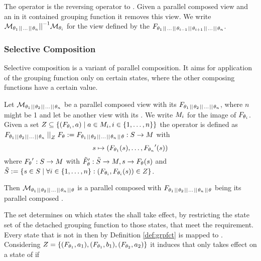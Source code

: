 \documentclass[preview]{standalone}
\begin{document}
The operator \pllrev is the reversing operator to \pll. Given a parallel composed view and an in it contained grouping function it removes this view. We write $\view[\viewppty_1 \pll \dots \pll \viewppty_n] \pllrev \view[\viewppty_i]$ for the view defined by the \grpfctN $\grpfct[\viewppty_1 \pll \dots \pll \viewppty_{i-1} \pll \viewppty_{i+1} \pll \dots \pll \viewppty_n]$.

\subsubsection{Selective Composition} \label{subsec:selecitvecomp}
Selective composition is a variant of parallel composition. It aims for application of the grouping function only on certain states, where the other composing functions have a certain value.

\begin{definition}
	Let $\view[\viewppty_1 \pll \viewppty_2 \pll \dots \pll 
	\viewppty_n]$ be a parallel composed view with its \grpfctN $\grpfct[{\viewppty_1 \pll \viewppty_2 \pll \dots \pll \viewppty_n}]$, where $n$ might be 1 and let \view be another view with its \grpfctN \grpfct. 
	We write $\imggrp_i$ for the image of $\grpfct[\viewppty_i]$. 
	Given a set $\compselectset \subseteq \{ (\grpfct[\viewppty_i], a) \mid a \in \imggrp_i, i \in \{1, \dots, n\}\}$ the operator \compselectpure is defined as $\grpfct[{\viewppty_1 \pll \viewppty_2 \pll \dots \pll \viewppty_n}] \compselect \grpfct := \grpfct[{\viewppty_1 \pll \viewppty_2 \pll \dots \pll \viewppty_n} \pll \viewppty]: \states \to \arbset$ with
	\[
	\state \mapsto (\grpfct[\viewppty_1](\state), \dots, \grpfct[\viewppty_n]'(\state))
	\]
	where $\grpfct' : \states \to \imggrp$ with $\grpfctsub' : \smstates \to \imggrp, \state \to \grpfct(\state)$ and $\smstates := \{\state \in \states \mid \forall i \in \{1, \dots, n\} : (\grpfct[\viewppty_i], \grpfct[\viewppty_i](\state)) \in \compselectset\}$.
	
	
	
	\noindent
	Then $\view[\viewppty_1 \pll \viewppty_2 \pll \dots \pll 
	\viewppty_n \pll \viewppty]$ is a parallel composed \viewN with $\grpfct[{\viewppty_1 \pll \viewppty_2 \pll \dots \pll \viewppty_n} \pll \viewppty]$ being its parallel composed \grpfctN.
	\label{def:compositionselective}
\end{definition}

The set \compselectset determines on which states the \viewN \view shall take effect, by restricting the state set \smstates of the detached grouping function to those states, that meet the requirement. Every state that is not in \smstates then by Definition \ref{def:grpfct} is mapped to \remelem. Considering $\compselectset = \{(\grpfct[\viewppty_1], a_1),(\grpfct[\viewppty_1], b_1), (\grpfct[\viewppty_2], a_2)\}$ it induces that \view only takes effect on a state \state of \mdp if 
\end{document}
